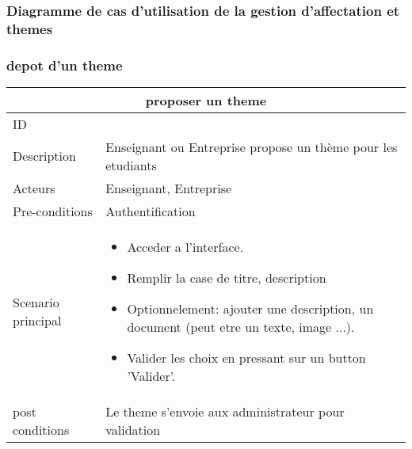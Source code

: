 \documentclass[11pt,fleqn]{book} %
\begin{document}
\subsubsection{Diagramme de cas d’utilisation de la gestion 
d'affectation et themes}


\subsubsection{depot d'un theme}
\begin{center}
\begin{tabularx}{1\textwidth} { | p{4cm} | >{\raggedright\arraybackslash}X |  }
  \hline
  \multicolumn{2}{|c|}{proposer un theme} \\
 \hline
 ID & 1  \\
 \hline
 Description  & Enseignant ou Entreprise propose un thème pour les etudiants \\
  \hline
 Acteurs  & Enseignant, Entreprise   \\
  \hline
 Pre-conditions  & Authentification\\
 \hline
 Scenario principal  &  
 \begin{itemize}
     \item  Acceder a l’interface.
     \item Remplir la case de titre, description
     \item Optionnelement: ajouter une description, un document (peut etre un texte, image ...).
     \item Valider les choix en pressant sur un button ’Valider’.
 \end{itemize}\\
  \hline
 post conditions  &   Le theme s’envoie aux administrateur pour validation  \\
  \hline
\end{tabularx}
\label{tbl:nicetablelesstable}
\end{center}
\end{document}
